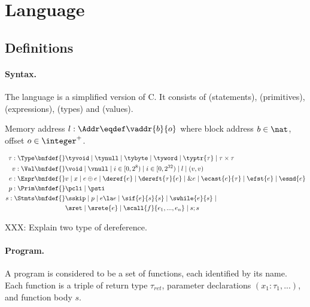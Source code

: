 \section{Language}
\label{sec:language}

\subsection{Definitions}

\paragraph{Syntax.}\label{p:type}

The language is a simplified version of C. It consists of \Stmts{} (statements), \Prim{} (primitives),
\Expr{} (expressions), \Type{} (types) and \Val{} (values).

Memory address $l: \Addr \eqdef \vaddr{b}{o}$ where block address $b \in \nat$, offset $o \in \integer^{+}$.

\begin{align*}
    \tau : \Type \bnfdef{}&
        \tyvoid \mid \tynull \mid \tybyte \mid \tyword \mid \typtr{\tau} \mid \tau \times \tau
\\
    v : \Val \bnfdef{}&
        \void \mid \vnull \mid i \in [0, 2^8) \mid i \in [0, 2^{32}) \mid l \mid (v, v)
\\
    e : \Expr \bnfdef{}&
        v \mid x \mid e \oplus e \mid \deref{e} \mid \dereft{\tau}{e} \mid \& e \mid \ecast{e}{\tau} \mid \efst{e} \mid \esnd{e}
\\
    p : \Prim \bnfdef{}&
        \pcli \mid \psti
\\
    s : \Stmts \bnfdef{}&
        \sskip \mid p \mid e \la e \mid \sif{e}{s}{s} \mid \swhile{e}{s} \mid \\&
        \sret \mid \srete{e} \mid \scall{f}{e_1, ..., e_n} \mid s ; s
\\
\end{align*}

XXX: Explain two type of dereference.

\paragraph{Program.}

A program is considered to be a set of functions, each identified by its name. Each
function is a triple of return type $\tau_{ret}$, parameter declarations $(x_1 : \tau_1, ...)$,
and function body $s$.

